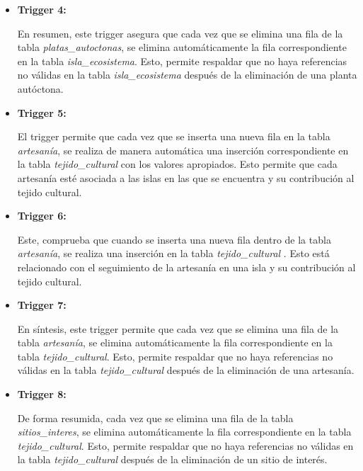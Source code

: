 \documentclass[11pt]{report}
\begin{document}
\begin{itemize}
      \item \textbf{Trigger 4:} 
            \lstset{style=mystyle}
            

En resumen, este trigger asegura que cada vez que se elimina una fila de la tabla \emph{platas\_autoctonas}, se elimina automáticamente la fila correspondiente en la tabla \emph{isla\_ecosistema}. Esto, permite respaldar que no haya referencias no válidas en la tabla \emph{isla\_ecosistema} después de la eliminación de una planta autóctona.

      \item \textbf{Trigger 5:} 
            \lstset{style=mystyle}
            

El trigger permite que cada vez que se inserta una nueva fila en la tabla \emph{artesanía}, se realiza de manera automática una inserción correspondiente en la tabla \emph{tejido\_cultural} con los valores apropiados. Esto permite que cada artesanía esté asociada a las islas en las que se encuentra y su contribución al tejido cultural.  

      \item \textbf{Trigger 6:} 
            \lstset{style=mystyle}
            

Este, comprueba que cuando se inserta una nueva fila dentro de la tabla \emph{artesanía}, se realiza una inserción en la tabla \emph{tejido\_cultural} . Esto está relacionado con el seguimiento de la artesanía en una isla y su contribución al tejido cultural.

      \item \textbf{Trigger 7:} 
            \lstset{style=mystyle}
            

En síntesis, este trigger permite que cada vez que se elimina una fila de la tabla \emph{artesanía}, se elimina automáticamente la fila correspondiente en la tabla \emph{tejido\_cultural}. Esto, permite respaldar que no haya referencias no válidas en la tabla \emph{tejido\_cultural} después de la eliminación de una artesanía.

      \item \textbf{Trigger 8:} 
            \lstset{style=mystyle}
            

De forma resumida, cada vez que se elimina una fila de la tabla \emph{sitios\_interes}, se elimina automáticamente la fila correspondiente en la tabla \emph{tejido\_cultural}. Esto, permite respaldar que no haya referencias no válidas en la tabla \emph{tejido\_cultural} después de la eliminación de un sitio de interés.


\end{itemize}
\end{document}
